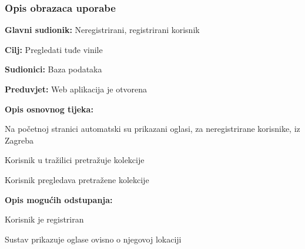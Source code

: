 				\subsubsection{Opis obrazaca uporabe}
					

				\noindent {}
					\begin{packed_item}
	
						\item \textbf{Glavni sudionik: }Neregistrirani, registrirani korisnik
						\item  \textbf{Cilj:} Pregledati tuđe vinile
						\item  \textbf{Sudionici:} Baza podataka
						\item  \textbf{Preduvjet:} Web aplikacija je otvorena
						\item  \textbf{Opis osnovnog tijeka:}
						
						\item[] \begin{packed_enum}
	
							\item Na početnoj stranici automatski su prikazani oglasi, za neregistrirane korisnike, iz Zagreba
							\item Korisnik u tražilici pretražuje kolekcije
							\item Korisnik pregledava pretražene kolekcije

						\end{packed_enum}
						
						\item  \textbf{Opis mogućih odstupanja:}
						
						\item[] \begin{packed_item}
	
							\item[1.a] Korisnik je registriran
								\begin{packed_item}
									\item Sustav prikazuje oglase ovisno o njegovoj lokaciji
								\end{packed_item}
							
						\end{packed_item}						
					\end{packed_item}
					
